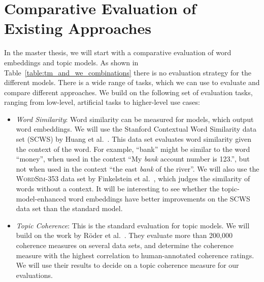 \documentclass{sig-alternate-05-2015}
\begin{document}
\section{Comparative Evaluation of Existing Approaches}
\label{sec:comparative-evaluation}
In the master thesis, we will start with a comparative evaluation of word embeddings and topic models.
As shown in Table~\ref{table:tm_and_we_combinations} there is no evaluation strategy for the different models.
There is a wide range of tasks, which we can use to evaluate and compare different approaches.
We build on the following set of evaluation tasks, ranging from low-level, artificial tasks to higher-level use cases:
\begin{itemize}
       \item
              \emph{Word Similarity}:
              Word similarity can be measured for models, which output word embeddings.
              We will use the Stanford Contextual Word Similarity data set (\textsc{SCWS}) by Huang et al.~\cite{Huang2008}.
              This data set evaluates word similarity given the context of the word.
              For example, ``bank'' might be similar to the word ``money'', when used in the context ``My \emph{bank} account number is 123.'', but not when used in the context ``the east \emph{bank} of the river''.
              We will also use the \textsc{WordSim-353} data set by Finkelstein et al.~\cite{Finkelstein2002}, which judges the similarity of words without a context.
              It will be interesting to see whether the topic-model-enhanced word embeddings have better improvements on the SCWS data set than the standard model.
       \item
              \emph{Topic Coherence}:
              This is the standard evaluation for topic models.
              We will build on the work by Röder et al.~\cite{Roder2015}.
              They evaluate more than 200,000 coherence measures on several data sets, and determine the coherence measure with the highest correlation to human-annotated coherence ratings.
              We will use their results to decide on a topic coherence measure for our evaluations.

\end{itemize}
\end{document}
